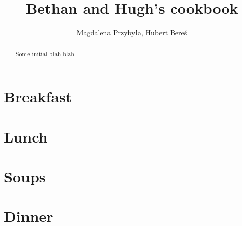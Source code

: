 \documentclass[%
twoside,
11pt
]{article}
\begin{document}
\title{Bethan and Hugh's cookbook}
\author{Magdalena Przybyła, Hubert Bereś}
\maketitle

\begin{abstract}
    Some initial blah blah.
\end{abstract}

\tableofcontents

\vspace{5em}
\newpage

\section{Breakfast}


\newpage

\newpage

\newpage

\newpage

\newpage

\newpage

\section{Lunch}


\newpage

\newpage

\newpage

\newpage

\newpage

\newpage

\newpage

\section{Soups}


\newpage

\newpage

\newpage

\newpage

\newpage


\section{Dinner}


\newpage

\newpage

\newpage

\newpage

\newpage

\newpage

\newpage

\newpage
\newpage

\newpage

\newpage

\newpage

\newpage

\newpage

\newpage
\end{document}
